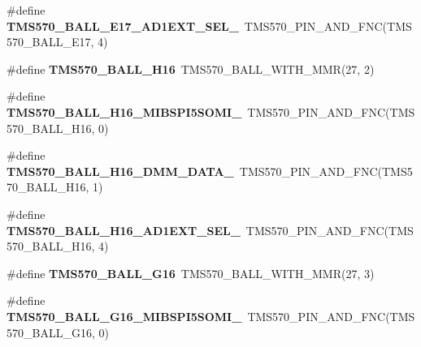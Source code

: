 \begin{DoxyCompactItemize}
\item 
\mbox{\label{tms570lc4357-pins_8h_a5e11637d89a102bf084a530e074eb684}} 
\#define {\bfseries T\+M\+S570\+\_\+\+B\+A\+L\+L\+\_\+\+E17\+\_\+\+A\+D1\+E\+X\+T\+\_\+\+S\+E\+L\+\_}~T\+M\+S570\+\_\+\+P\+I\+N\+\_\+\+A\+N\+D\+\_\+\+F\+NC(T\+M\+S570\+\_\+\+B\+A\+L\+L\+\_\+\+E17, 4)
\item 
\mbox{\label{tms570lc4357-pins_8h_a52f1f52aeddf4ae40e61a4c47a83fd1a}} 
\#define {\bfseries T\+M\+S570\+\_\+\+B\+A\+L\+L\+\_\+\+H16}~T\+M\+S570\+\_\+\+B\+A\+L\+L\+\_\+\+W\+I\+T\+H\+\_\+\+M\+MR(27, 2)
\item 
\mbox{\label{tms570lc4357-pins_8h_a03157d7937fa49749dfae348cb1ecf2a}} 
\#define {\bfseries T\+M\+S570\+\_\+\+B\+A\+L\+L\+\_\+\+H16\+\_\+\+M\+I\+B\+S\+P\+I5\+S\+O\+M\+I\+\_}~T\+M\+S570\+\_\+\+P\+I\+N\+\_\+\+A\+N\+D\+\_\+\+F\+NC(T\+M\+S570\+\_\+\+B\+A\+L\+L\+\_\+\+H16, 0)
\item 
\mbox{\label{tms570lc4357-pins_8h_afbc93b5d39142954be6909fd410442bc}} 
\#define {\bfseries T\+M\+S570\+\_\+\+B\+A\+L\+L\+\_\+\+H16\+\_\+\+D\+M\+M\+\_\+\+D\+A\+T\+A\+\_}~T\+M\+S570\+\_\+\+P\+I\+N\+\_\+\+A\+N\+D\+\_\+\+F\+NC(T\+M\+S570\+\_\+\+B\+A\+L\+L\+\_\+\+H16, 1)
\item 
\mbox{\label{tms570lc4357-pins_8h_aa35ec314879094b95fecd2d08d6c0dba}} 
\#define {\bfseries T\+M\+S570\+\_\+\+B\+A\+L\+L\+\_\+\+H16\+\_\+\+A\+D1\+E\+X\+T\+\_\+\+S\+E\+L\+\_}~T\+M\+S570\+\_\+\+P\+I\+N\+\_\+\+A\+N\+D\+\_\+\+F\+NC(T\+M\+S570\+\_\+\+B\+A\+L\+L\+\_\+\+H16, 4)
\item 
\mbox{\label{tms570lc4357-pins_8h_abd8b37c054fb081ebf35e8a22102bc7c}} 
\#define {\bfseries T\+M\+S570\+\_\+\+B\+A\+L\+L\+\_\+\+G16}~T\+M\+S570\+\_\+\+B\+A\+L\+L\+\_\+\+W\+I\+T\+H\+\_\+\+M\+MR(27, 3)
\item 
\mbox{\label{tms570lc4357-pins_8h_a4195653514a927f993389674a493ff68}} 
\#define {\bfseries T\+M\+S570\+\_\+\+B\+A\+L\+L\+\_\+\+G16\+\_\+\+M\+I\+B\+S\+P\+I5\+S\+O\+M\+I\+\_}~T\+M\+S570\+\_\+\+P\+I\+N\+\_\+\+A\+N\+D\+\_\+\+F\+NC(T\+M\+S570\+\_\+\+B\+A\+L\+L\+\_\+\+G16, 0)
\item 

\end{DoxyCompactItemize}
